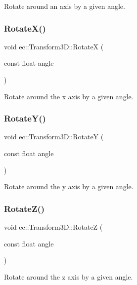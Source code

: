 Rotate around an axis by a given angle. \mbox{\label{classec_1_1_transform3_d_a04e4eaf695ba795bac09e8fa43c0a462}} 
\subsubsection{\texorpdfstring{Rotate\+X()}{RotateX()}}
{\footnotesize\ttfamily void ec\+::\+Transform3\+D\+::\+RotateX (\begin{DoxyParamCaption}\item[{const float}]{angle }\end{DoxyParamCaption})}

Rotate around the x axis by a given angle. \mbox{\label{classec_1_1_transform3_d_a71e31dbecd1bfad8754c7b3bca691876}} 
\subsubsection{\texorpdfstring{Rotate\+Y()}{RotateY()}}
{\footnotesize\ttfamily void ec\+::\+Transform3\+D\+::\+RotateY (\begin{DoxyParamCaption}\item[{const float}]{angle }\end{DoxyParamCaption})}

Rotate around the y axis by a given angle. \mbox{\label{classec_1_1_transform3_d_aff76dc65f161ff8401976561772dd2fc}} 
\subsubsection{\texorpdfstring{Rotate\+Z()}{RotateZ()}}
{\footnotesize\ttfamily void ec\+::\+Transform3\+D\+::\+RotateZ (\begin{DoxyParamCaption}\item[{const float}]{angle }\end{DoxyParamCaption})}

Rotate around the z axis by a given angle. \mbox{\label{classec_1_1_transform3_d_a6f6909d1f35cc5c4d4340e6fe56d5e4d}} 

